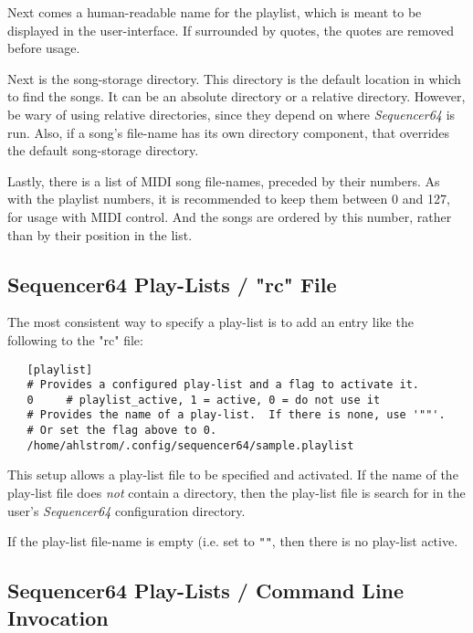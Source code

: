    Next comes a human-readable name for the playlist, which is meant to be
   displayed in the user-interface.  If surrounded by quotes, the quotes are
   removed before usage.

   Next is the song-storage directory.
   This directory is the default location in which to find the songs.
   It can be an absolute directory or a relative directory.
   However, be wary of using relative directories, since they depend on where
   \textsl{Sequencer64} is run.
   Also, if a song's file-name  has its own directory component, that overrides
   the default song-storage directory.

   Lastly, there is a list of MIDI song file-names, preceded by their numbers.
   As with the playlist numbers, it is recommended to keep them between 0 and
   127, for usage with MIDI control.  And the songs are ordered by this number,
   rather than by their position in the list.

\subsection{Sequencer64 Play-Lists / "rc" File}
\label{subsec:playlist_rc_file}

   The most consistent way to specify a play-list is to add an entry like the
   following to the "rc" file:

   \begin{verbatim}
   [playlist]
   # Provides a configured play-list and a flag to activate it.
   0     # playlist_active, 1 = active, 0 = do not use it
   # Provides the name of a play-list.  If there is none, use '""'.
   # Or set the flag above to 0.
   /home/ahlstrom/.config/sequencer64/sample.playlist
   \end{verbatim}

   This setup allows a play-list file to be specified and activated.
   If the name of the play-list file does \textsl{not} contain a directory,
   then the play-list file is search for in the user's \textsl{Sequencer64}
   configuration directory.

   If the play-list file-name is empty (i.e. set to \texttt{""}, then there is
   no play-list active.

\subsection{Sequencer64 Play-Lists / Command Line Invocation}
\label{subsec:playlist_cmd_line}

